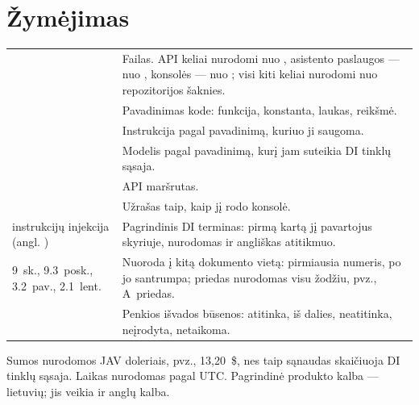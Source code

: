 \section*{Žymėjimas}

\begin{tabularx}{\textwidth}{@{}L{44mm}Y@{}}
  \toprule
   &  \\
  \midrule
   & Failas. API keliai nurodomi nuo , asistento paslaugos --- nuo , konsolės --- nuo ; visi kiti keliai nurodomi nuo repozitorijos šaknies. \\
   & Pavadinimas kode: funkcija, konstanta, laukas, reikšmė. \\
   & Instrukcija pagal pavadinimą, kuriuo ji saugoma. \\
   & Modelis pagal pavadinimą, kurį jam suteikia DI tinklų sąsaja. \\
   & API maršrutas. \\
   & Užrašas taip, kaip jį rodo konsolė. \\
  instrukcijų injekcija (angl. ) & Pagrindinis DI terminas: pirmą kartą jį pavartojus skyriuje, nurodomas ir angliškas atitikmuo. \\
  9~sk., 9.3~posk., 3.2~pav., 2.1~lent. & Nuoroda į kitą dokumento vietą: pirmiausia numeris, po jo santrumpa; priedas nurodomas visu žodžiu, pvz., A~priedas. \\
       & Penkios išvados būsenos: atitinka, iš dalies, neatitinka, neįrodyta, netaikoma. \\
  \bottomrule
\end{tabularx}

Sumos nurodomos JAV doleriais, pvz., 13,20~\$, nes taip sąnaudas skaičiuoja DI tinklų sąsaja. Laikas nurodomas pagal UTC. Pagrindinė produkto kalba --- lietuvių; jis veikia ir anglų kalba.
